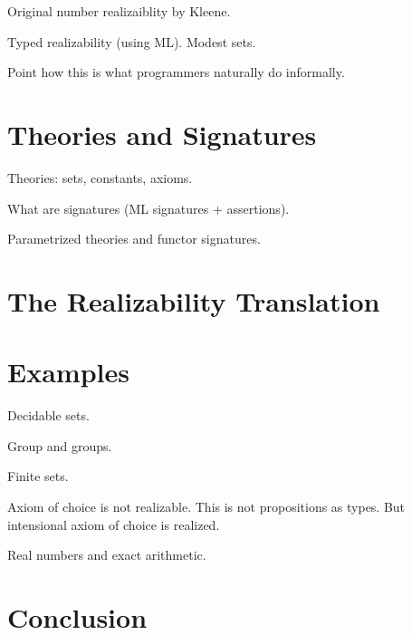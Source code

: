 \documentclass{article}
\begin{document}
Original number realizaiblity by Kleene.

Typed realizability (using ML). Modest sets.

Point how this is what programmers naturally do informally.

\section{Theories and Signatures}
\label{sec:theories-signatures}

Theories: sets, constants, axioms.

What are signatures (ML signatures + assertions).

Parametrized theories and functor signatures.


\section{The Realizability Translation}
\label{sec:real-transl}


\section{Examples}
\label{sec:examples}

Decidable sets.

Group and groups.

Finite sets.

Axiom of choice is not realizable. This is not propositions as types.
But intensional axiom of choice is realized.

Real numbers and exact arithmetic.


\section{Conclusion}
\label{sec:conclusion}
\end{document}
